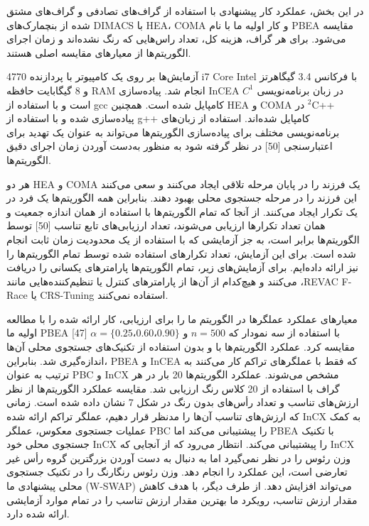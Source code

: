 \documentclass[a4paper,10pt]{article}
\begin{document}
        در این بخش، عملکرد کار پیشنهادی با استفاده از گراف‌های تصادفی و گراف‌های مشتق شده از بنچمارک‌های DIMACS با HEA، COMA و کار اولیه ما با نام PBEA مقایسه می‌شود. برای هر گراف، هزینه کل، تعداد راس‌هایی که رنگ نشده‌اند و زمان اجرای الگوریتم‌ها از معیارهای مقایسه اصلی هستند.

        آزمایش‌ها بر روی یک کامپیوتر با پردازنده  4770 i7 Core Intel با فرکانس 3.4 گیگاهرتز و 8 گیگابایت حافظه RAM انجام شد. پیاده‌سازی InCEA در زبان برنامه‌نویسی $C^1$ است و با استفاده از gcc کامپایل شده است. همچنین HEA و COMA در $^2$C++ پیاده‌سازی شده و با استفاده از g++ کامپایل شده‌اند. استفاده از زبان‌های برنامه‌نویسی مختلف برای پیاده‌سازی الگوریتم‌ها می‌تواند به عنوان یک تهدید برای اعتبارسنجی [50] در نظر گرفته شود به منظور به‌دست آوردن زمان اجرای دقیق الگوریتم‌ها.

        هر دو HEA و COMA یک فرزند را در پایان مرحله تلاقی ایجاد می‌کنند و سعی می‌کنند این فرزند را در مرحله جستجوی محلی بهبود دهند. بنابراین همه الگوریتم‌ها یک فرد در یک تکرار ایجاد می‌کنند. از آنجا که تمام الگوریتم‌ها با استفاده از همان اندازه جمعیت و همان تعداد تکرارها ارزیابی می‌شوند، تعداد ارزیابی‌های تابع تناسب [50] توسط الگوریتم‌ها برابر است، به جز آزمایشی که با استفاده از یک محدودیت زمان ثابت انجام شده است. برای این آزمایش، تعداد تکرارهای استفاده شده توسط تمام الگوریتم‌ها را نیز ارائه داده‌ایم. برای آزمایش‌های زیر، تمام الگوریتم‌ها پارامترهای یکسانی را دریافت می‌کنند و هیچ‌کدام از آن‌ها از پارامترهای کنترل یا تنظیم‌کننده‌هایی مانند ،REVAC F-Race یا CRS-Tuning استفاده نمی‌کنند.

        معیارهای عملکرد عملگرها در الگوریتم ما را برای ارزیابی، کار ارائه شده را با مطالعه اولیه ما PBEA [47] با استفاده از سه نمودار که $n = 500$ و $\alpha = \{0.25، 0.60، 0.90\}$ مقایسه کرد. عملکرد الگوریتم‌ها با و بدون استفاده از تکنیک‌های جستجوی محلی آن‌ها اندازه‌گیری شد. بنابراین، PBEA و InCEA که فقط با عملگرهای تراکم کار می‌کنند به ترتیب به عنوان PBC و InCX مشخص می‌شوند. عملکرد الگوریتم‌ها 20 بار در هر گراف با استفاده از 20 کلاس رنگ ارزیابی شد. مقایسه عملکرد الگوریتم‌ها از نظر ارزش‌های تناسب و تعداد رأس‌های بدون رنگ در شکل 7 نشان داده شده است. زمانی که ارزش‌های تناسب آن‌ها را مدنظر قرار دهیم، عملگر تراکم ارائه شده InCX به کمک عملیات جستجوی معکوس، عملگر PBC را پیشتیبانی می‌کند اما PBEA با تکنیک جستجوی محلی خود InCX را پیشتیبانی می‌کند. انتظار می‌رود که از آنجایی که InCX وزن رئوس را در نظر نمی‌گیرد اما به دنبال به دست آوردن بزرگترین گروه رأس غیر تعارضی است، این عملکرد را انجام دهد. وزن رئوس رنگارنگ را در تکنیک جستجوی محلی پیشنهادی ما (W-SWAP) می‌تواند افزایش دهد. از طرف دیگر، با هدف کاهش مقدار ارزش تناسب، رویکرد ما بهترین مقدار ارزش تناسب را در تمام موارد آزمایشی ارائه شده دارد.
\end{document}
